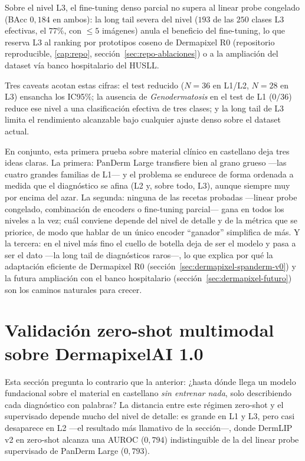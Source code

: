 Sobre el nivel L3, el fine-tuning denso parcial no supera al linear probe congelado (BAcc $0{,}184$ en ambos): la long tail severa del
nivel ($193$ de las $250$ clases L3 efectivas, el $77\%$, con $\leq 5$
imágenes) anula el beneficio
del fine-tuning, lo que reserva L3 al ranking por prototipos coseno de
Dermapixel R0 (repositorio reproducible, \ref{cap:repo}, sección~\ref{sec:repo-ablaciones}) o a la
ampliación del dataset vía banco hospitalario del HUSLL.

Tres caveats acotan estas cifras: el test reducido ($N = 36$
en L1/L2, $N = 28$ en L3) ensancha los IC95\%; la ausencia de
\emph{Genodermatosis} en el test de L1 ($0 / 36$) reduce ese nivel a
una clasificación efectiva de tres clases; y la long tail de L3
limita el rendimiento alcanzable bajo cualquier ajuste denso sobre el
dataset actual.

En conjunto, esta primera prueba sobre material clínico en castellano
deja tres ideas claras. La primera: PanDerm Large transfiere bien al
grano grueso ---las cuatro grandes familias de L1--- y el problema se
endurece de forma ordenada a medida que el diagnóstico se afina (L2 y,
sobre todo, L3), aunque siempre muy por encima del azar. La segunda:
ninguna de las recetas probadas ---linear probe congelado, combinación
de encoders o fine-tuning parcial--- gana en todos los niveles a la vez;
cuál conviene depende del nivel de detalle y de la métrica que se
priorice, de modo que hablar de un único encoder ``ganador'' simplifica
de más. Y la tercera: en el nivel más fino el cuello de botella deja de
ser el modelo y pasa a ser el dato ---la long tail de diagnósticos
raros---, lo que explica por qué la adaptación eficiente de Dermapixel R0
(sección~\ref{sec:dermapixel-spanderm-v0}) y la futura ampliación con el
banco hospitalario (sección~\ref{sec:dermapixel-futuro}) son los caminos
naturales para crecer.

\section{Validación zero-shot multimodal sobre DermapixelAI 1.0}
\label{sec:dermapixel-zs}

Esta sección pregunta lo contrario que la anterior: ¿hasta dónde llega
un modelo fundacional sobre el material en castellano \emph{sin
entrenar nada}, solo describiendo cada diagnóstico con palabras? La
distancia entre este régimen zero-shot y el supervisado depende
mucho del nivel de detalle: es grande en L1 y L3, pero casi desaparece
en L2 ---el resultado más llamativo de la sección---, donde DermLIP v2
en zero-shot alcanza una AUROC ($0{,}794$) indistinguible de la
del linear probe supervisado de PanDerm Large ($0{,}793$).

